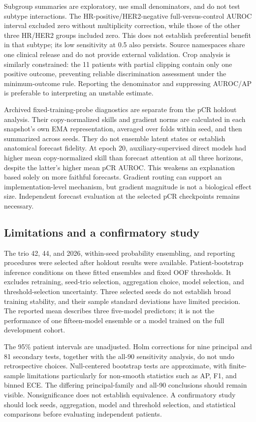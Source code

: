 Subgroup summaries are exploratory, use small denominators, and do not test subtype interactions. The HR-positive/HER2-negative full-versus-control AUROC interval excluded zero without multiplicity correction, while those of the other three HR/HER2 groups included zero. This does not establish preferential benefit in that subtype; its low sensitivity at 0.5 also persists. Source namespaces share one clinical release and do not provide external validation. Crop analysis is similarly constrained: the 11 patients with partial clipping contain only one positive outcome, preventing reliable discrimination assessment under the minimum-outcome rule. Reporting the denominator and suppressing AUROC/AP is preferable to interpreting an unstable estimate.

Archived fixed-training-probe diagnostics are separate from the pCR holdout analysis. Their copy-normalized skills and gradient norms are calculated in each snapshot's own EMA representation, averaged over folds within seed, and then summarized across seeds. They do not ensemble latent states or establish anatomical forecast fidelity. At epoch 20, auxiliary-supervised direct models had higher mean copy-normalized skill than forecast attention at all three horizons, despite the latter's higher mean pCR AUROC. This weakens an explanation based solely on more faithful forecasts. Gradient routing can support an implementation-level mechanism, but gradient magnitude is not a biological effect size. Independent forecast evaluation at the selected pCR checkpoints remains necessary.

\subsection{Limitations and a confirmatory study}
\label{sec:limitations}
The trio 42, 44, and 2026, within-seed probability ensembling, and reporting procedures were selected after holdout results were available. Patient-bootstrap inference conditions on these fitted ensembles and fixed OOF thresholds. It excludes retraining, seed-trio selection, aggregation choice, model selection, and threshold-selection uncertainty. Three selected seeds do not establish broad training stability, and their sample standard deviations have limited precision. The reported mean describes three five-model predictors; it is not the performance of one fifteen-model ensemble or a model trained on the full development cohort.

The 95\% patient intervals are unadjusted. Holm corrections for nine principal and 81 secondary tests, together with the all-90 sensitivity analysis, do not undo retrospective choices. Null-centered bootstrap tests are approximate, with finite-sample limitations particularly for non-smooth statistics such as AP, F1, and binned ECE. The differing principal-family and all-90 conclusions should remain visible. Nonsignificance does not establish equivalence. A confirmatory study should lock seeds, aggregation, model and threshold selection, and statistical comparisons before evaluating independent patients.

